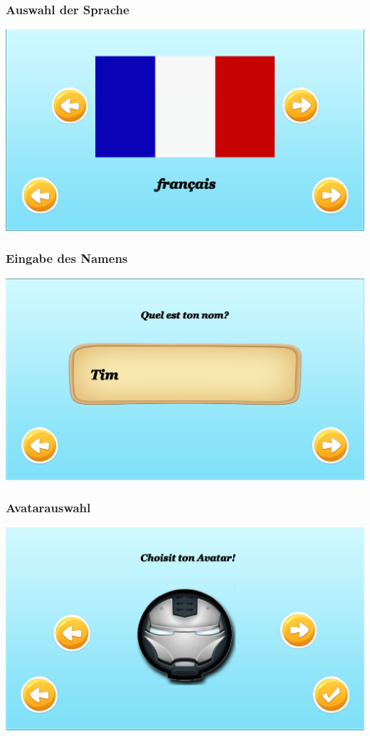 \documentclass[18pt]{beamer}
\begin{document}
\begin{frame}
	\frametitle{Auswahl der Sprache}
	\includegraphics[width=\textwidth]{pictures/languageselection}
\end{frame}

\begin{frame}
	\frametitle{Eingabe des Namens}
	\includegraphics[width=\textwidth]{pictures/nameselection}
\end{frame}

\begin{frame}
	\frametitle{Avatarauswahl}
	\includegraphics[width=\textwidth]{pictures/avatarselection}
\end{frame}
\end{document}
